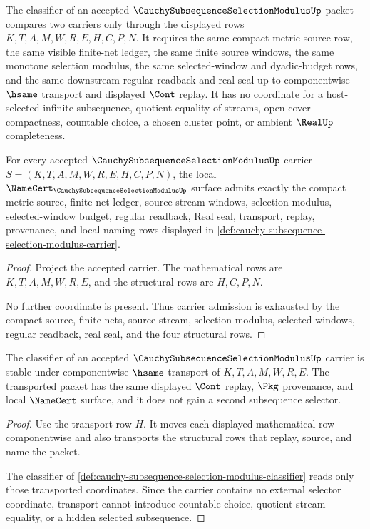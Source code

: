 \begin{definition}
\label{def:cauchy-subsequence-selection-modulus-classifier}
The classifier of an accepted $\CauchySubsequenceSelectionModulusUp$ packet compares two carriers only through the displayed rows $K,T,A,M,W,R,E,H,C,P,N$. It requires the same compact-metric source row, the same visible finite-net ledger, the same finite source windows, the same monotone selection modulus, the same selected-window and dyadic-budget rows, and the same downstream regular readback and real seal up to componentwise $\hsame$ transport and displayed $\Cont$ replay. It has no coordinate for a host-selected infinite subsequence, quotient equality of streams, open-cover compactness, countable choice, a chosen cluster point, or ambient $\RealUp$ completeness.
\end{definition}

\begin{theorem}
\label{thm:cauchy-subsequence-selection-modulus-carrier-admission}
For every accepted $\CauchySubsequenceSelectionModulusUp$ carrier $S=(K,T,A,M,W,R,E,H,C,P,N)$, the local $\NameCert_{\CauchySubsequenceSelectionModulusUp}$ surface admits exactly the compact metric source, finite-net ledger, source stream windows, selection modulus, selected-window budget, regular readback, Real seal, transport, replay, provenance, and local naming rows displayed in \autoref{def:cauchy-subsequence-selection-modulus-carrier}.
\end{theorem}
\begin{proof}
Project the accepted carrier. The mathematical rows are $K,T,A,M,W,R,E$, and the structural rows are $H,C,P,N$.

No further coordinate is present. Thus carrier admission is exhausted by the compact source, finite nets, source stream, selection modulus, selected windows, regular readback, real seal, and the four structural rows.
\end{proof}

\begin{theorem}
\label{thm:cauchy-subsequence-selection-modulus-classifier-stability}
The classifier of an accepted $\CauchySubsequenceSelectionModulusUp$ carrier is stable under componentwise $\hsame$ transport of $K,T,A,M,W,R,E$. The transported packet has the same displayed $\Cont$ replay, $\Pkg$ provenance, and local $\NameCert$ surface, and it does not gain a second subsequence selector.
\end{theorem}
\begin{proof}
Use the transport row $H$. It moves each displayed mathematical row componentwise and also transports the structural rows that replay, source, and name the packet.

The classifier of \autoref{def:cauchy-subsequence-selection-modulus-classifier} reads only those transported coordinates. Since the carrier contains no external selector coordinate, transport cannot introduce countable choice, quotient stream equality, or a hidden selected subsequence.
\end{proof}

